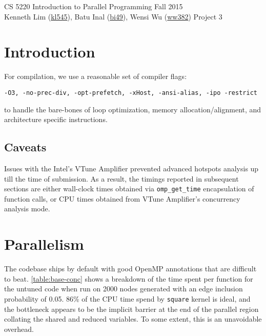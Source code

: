 \documentclass{scrartcl}
\begin{document}
  \begin{framed}
  CS 5220 Introduction to Parallel Programming \hfill Fall 2015 \\
  Kenneth Lim (\href{mailto:kl545@cornell.edu}{kl545}), Batu Inal (\href{mailto:bi49@cornell.edu}{bi49}), Wensi Wu (\href{mailto:ww382@cornell.edu}{ww382}) \hfill Project 3 \hspace{-3ex}
  \end{framed}
  \section{Introduction}
  For compilation, we use a reasonable set of compiler flags:
  \begin{verbatim}-O3, -no-prec-div, -opt-prefetch, -xHost, -ansi-alias, -ipo -restrict\end{verbatim}
  to handle the bare-bones of loop optimization, memory allocation/alignment, and architecture specific instructions.

  \subsection{Caveats}
  Issues with the Intel's VTune Amplifier prevented advanced hotspots analysis up till the time of submission. As a result, the timings reported in subsequent sections are either wall-clock times obtained via \texttt{omp\_get\_time} encapsulation of function calls, or CPU times obtained from VTune Amplifier's concurrency analysis mode.

  \section{Parallelism}
  The codebase ships by default with good OpenMP annotations that are difficult to beat. \autoref{table:base-conc} shows a breakdown of the time spent per function for the untuned code when run on 2000 nodes generated with an edge inclusion probability of 0.05. 86\% of the CPU time spend by \texttt{square} kernel is ideal, and the bottleneck appears to be the implicit barrier at the end of the parallel region collating the shared and reduced variables. To some extent, this is an unavoidable overhead.
\end{document}

